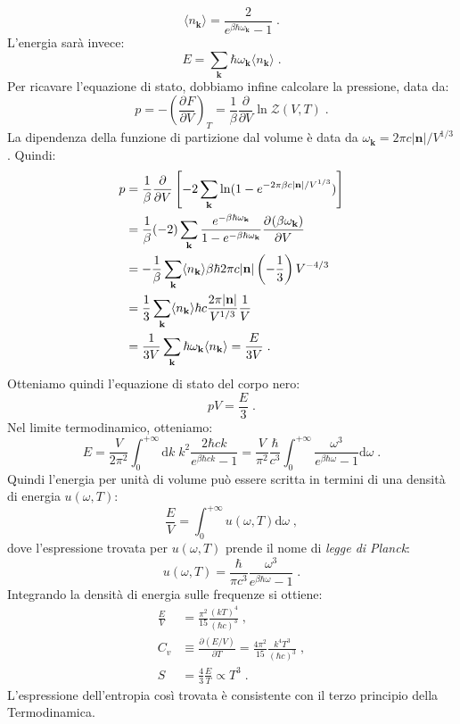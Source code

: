 \documentclass[10pt,a4paper]{report}
\theoremstyle{definition}
\newcommand{\pdev}[3][]{\frac{\partial^{#1} #2}{\partial #3^{#1}}}
\numberwithin{equation}{section}
\newcommand{\diff}[1][]{\mathrm{d}#1}
\newcommand{\bra}{\langle}
\newcommand{\ket}{\rangle}
\newcommand{\zpart}{\mathcal{Z}}
\begin{document}
\begin{equation}
\bra n_{\mathbf{k}}\ket=\frac{2}{e^{\beta\hbar\omega_{\mathbf{k}}}-1}\;.
\end{equation}
L'energia sarà invece:
\begin{equation}
E=\sum_{\mathbf{k}}\hbar\omega_{\mathbf{k}}\bra n_{\mathbf{k}}\ket\;.
\end{equation}
Per ricavare l'equazione di stato, dobbiamo infine calcolare la pressione, data da:
$$
p=-\left(\pdev{F}{V}\right)_T=\frac{1}{\beta}\frac{\partial}{\partial V}\ln\zpart(V,T)\;.
$$
La dipendenza della funzione di partizione dal volume è data da $\omega_{\mathbf{k}}=2\pi c|\mathbf{n}|/V^{1/3}$. Quindi:
\begin{align}
p &= \frac{1}{\beta}\frac{\partial}{\partial V}\left[-2\sum_{\mathbf{k}}\ln(1-e^{-2\pi\beta c|\mathbf{n}|/V^{1/3}})\right] \notag \\
&= \frac{1}{\beta}(-2)\sum_{\mathbf{k}}\frac{e^{-\beta\hbar\omega_{\mathbf{k}}}}{1-e^{-\beta\hbar\omega_{\mathbf{k}}}}\pdev{(\beta\omega_{\mathbf{k}})}{V} \notag \\
&= -\frac{1}{\beta}\sum_{\mathbf{k}}\bra n_{\mathbf{k}}\ket \beta\hbar 2\pi c|\mathbf{n}|\left(-\frac{1}{3}\right)V^{-4/3} \notag \\
&= \frac{1}{3}\sum_{\mathbf{k}}\bra n_{\mathbf{k}}\ket\hbar c\frac{2\pi|\mathbf{n}|}{V^{1/3}}\frac{1}{V} \notag \\
&= \frac{1}{3V}\sum_{\mathbf{k}}\hbar\omega_{\mathbf{k}}\bra n_{\mathbf{k}}\ket= \frac{E}{3V}\;.
\end{align}
Otteniamo quindi l'equazione di stato del corpo nero:
\begin{equation}
pV=\frac{E}{3}\;.
\end{equation}
Nel limite termodinamico, otteniamo:
$$
E=\frac{V}{2\pi^2}\int_0^{+\infty}\diff{k}\; k^2\frac{2\hbar ck}{e^{\beta\hbar ck}-1}=\frac{V}{\pi^2}\frac{\hbar}{c^3}\int_0^{+\infty}\frac{\omega^3}{e^{\beta\hbar\omega}-1}\diff{\omega}\;.
$$
Quindi l'energia per unità di volume può essere scritta in termini di una densità di energia $u(\omega,T)$:
$$
\frac{E}{V}=\int_0^{+\infty}u(\omega,T)\diff{\omega}\;,
$$
dove l'espressione trovata per $u(\omega,T)$ prende il nome di \emph{legge di Planck}:
\begin{equation}
u(\omega,T)=\frac{\hbar}{\pi c^3}\frac{\omega^3}{e^{\beta\hbar\omega}-1}\;.
\end{equation}
Integrando la densità di energia sulle frequenze si ottiene:
\begin{align}
\frac{E}{V}&= \frac{\pi^2}{15}\frac{(kT)^4}{(\hbar c)^3}\;, \\
C_v&\equiv\pdev{(E/V)}{T}=\frac{4\pi^2}{15}\frac{k^4T^3}{(\hbar c)^3}\;, \\
S &=\frac{4}{3}\frac{E}{T}\propto T^3\;.
\end{align}
L'espressione dell'entropia così trovata è consistente con il terzo principio della Termodinamica.
\end{document}
